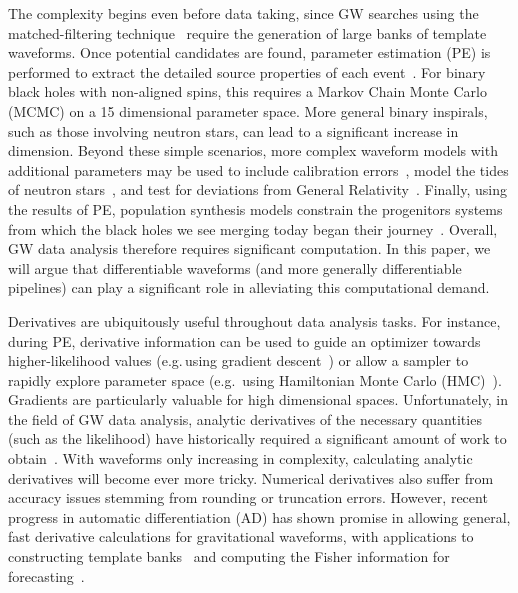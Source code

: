 \documentclass[twocolumn]{aastex631}
\begin{document}
The complexity begins even before data taking, since GW searches using the matched-filtering technique~\citep{Owen:1998dk, Owen:1995tm} require the generation of large banks of template waveforms.
Once potential candidates are found, parameter estimation (PE) is performed to extract the detailed source properties of each event~\citep{Christensen:2022bxb, 2020MNRAS.493.3132S, Ashton:2018jfp, Romero-Shaw:2020owr, Veitch:2014wba, Biwer:2018osg, kombine, 10.1093/mnras/stv2422}.
For binary black holes with non-aligned spins, this requires a Markov Chain Monte Carlo (MCMC) on a 15 dimensional parameter space.
More general binary inspirals, such as those involving neutron stars, can lead to a significant increase in dimension.
Beyond these simple scenarios, more complex waveform models with additional parameters may be used to include calibration errors~\citep{Farr:2014,Vitale:2020gvb}, model the tides of neutron stars~\citep{LIGOScientific:2018hze}, and test for deviations from General Relativity~\citep{Arun:2006yw, Agathos:2013upa, Yunes:2016jcc, LIGOScientific:2016lio, LIGOScientific:2020tif, Krishnendu:2021fga}.
Finally, using the results of PE, population synthesis models constrain the progenitors systems from which the black holes we see merging today began their journey~\citep{LIGOScientific:2020kqk, LIGOScientific:2021psn, Wong:2022flg}.
Overall, GW data analysis therefore requires significant computation.
In this paper, we will argue that differentiable waveforms (and more generally differentiable pipelines) can play a significant role in alleviating this computational demand.

Derivatives are ubiquitously useful throughout data analysis tasks.
For instance, during PE, derivative information can be used to guide an optimizer towards higher-likelihood values (e.g.\,using gradient descent~\citep{2016arXiv160904747R}) or allow a sampler to rapidly explore parameter space (e.g.\, using Hamiltonian Monte Carlo (HMC)~\citep{2011hmcm.book..113N,2017arXiv170102434B}).
Gradients are particularly valuable for high dimensional spaces.
Unfortunately, in the field of GW data analysis, analytic derivatives of the necessary quantities (such as the likelihood) have historically required a significant amount of work to obtain~\citep{Keppel:2013kia}.
With waveforms only increasing in complexity, calculating analytic derivatives will become ever more tricky.
Numerical derivatives also suffer from accuracy issues stemming from rounding or truncation errors.
However, recent progress in automatic differentiation (AD) has shown promise in allowing general, fast derivative calculations for gravitational waveforms, with applications to constructing template banks~\citep{Coogan:2022qxs} and computing the Fisher information for forecasting~\citep{Iacovelli:2022bbs, Iacovelli:2022mbg}.
\end{document}
